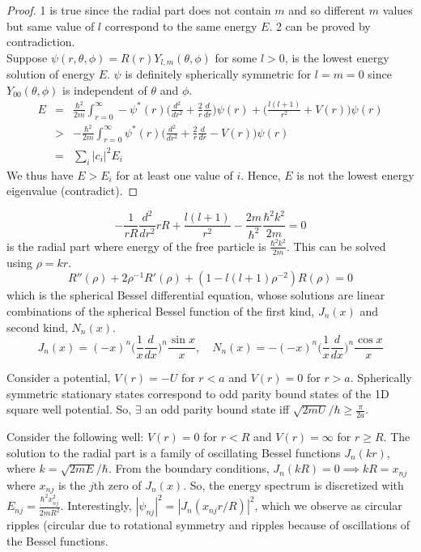 \documentclass[a4paper]{article}
\begin{document}
\begin{proof}
1 is true since the radial part does not contain $m$ and so different $m$ values but same value of $l$ correspond to the same energy $E$. 2 can be proved by contradiction.\\[5pt]
Suppose $\psi(r,\theta,\phi)=R(r)Y_{l,m}(\theta,\phi)$ for some $l>0$, is the lowest energy solution of energy $E$. $\psi$ is definitely spherically symmetric for $l=m=0$ since $Y_{00}(\theta,\phi)$ is independent of $\theta$ and $\phi$.
\begin{eqnarray}
E&=&\frac{\hbar^2}{2m}\int_{r=0}^\infty-\psi^*(r)\bigg(\frac{d^2}{dr^2}+\frac{2}{r}\frac{d}{dr}\bigg)\psi(r)+\bigg(\frac{l(l+1)}{r^2}+V(r)\bigg)\psi(r)\nonumber\\&>&-\frac{\hbar^2}{2m}\int_{r=0}^\infty\psi^*(r)\bigg(\frac{d^2}{dr^2}+\frac{2}{r}\frac{d}{dr}-V(r)\bigg)\psi(r)\nonumber\\&=&\sum_i|c_i|^2E_i\nonumber
\end{eqnarray}
We thus have $E>E_i$ for at least one value of $i$. Hence, $E$ is not the lowest energy eigenvalue (contradict).
\end{proof}
\begin{eg}
$$-\frac{1}{rR}\frac{d^2}{dr^2}rR+\frac{l(l+1)}{r^2}-\frac{2m}{\hbar^2}\frac{\hbar^2k^2}{2m}=0$$
is the radial part where energy of the free particle is $\frac{\hbar^2k^2}{2m}$. This can be solved using $\rho=kr$.
$$R''(\rho)+2\rho^{-1}R'(\rho)+(1-l(l+1)\rho^{-2})R(\rho)=0$$
which is the spherical Bessel differential equation, whose solutions are linear combinations of the spherical Bessel function of the first kind, $J_n(x)$ and second kind, $N_n(x)$.
$$J_n(x)=(-x)^n\bigg(\frac{1}{x}\frac{d}{dx}\bigg)^n\frac{\sin x}{x},\quad N_n(x)=-(-x)^n\bigg(\frac{1}{x}\frac{d}{dx}\bigg)^n\frac{\cos x}{x}$$
\end{eg}
\begin{eg}
Consider a potential, $V(r)=-U$ for $r<a$ and $V(r)=0$ for $r>a$. Spherically symmetric stationary states correspond to odd parity bound states of the 1D square well potential. So, $\exists$ an odd parity bound state iff $\sqrt{2mU}/\hbar\geq\frac{\pi}{2a}$. 
\end{eg}
\begin{eg}
Consider the following well: $V(r)=0$ for $r<R$ and $V(r)=\infty$ for $r\geq R$. The solution to the radial part is a family of oscillating Bessel functions $J_n(kr)$, where $k=\sqrt{2mE}/\hbar$. From the boundary conditions, $J_n(kR)=0\implies kR=x_{nj}$ where $x_{nj}$ is the $j$th zero of $J_n(x)$. So, the energy spectrum is discretized with $E_{nj}=\frac{\hbar^2x_{nj}^2}{2mR^2}$. Interestingly, $|\psi_{nj}|^2=|J_n(x_{nj}r/R)|^2$, which we observe as circular ripples (circular due to rotational symmetry and ripples because of oscillations of the Bessel functions.
\end{eg}
\end{document}
